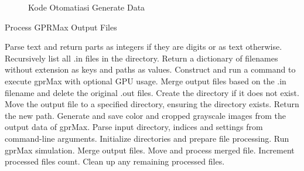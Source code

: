 \begin{minipage}{\linewidth}
\begin{figure} [H]
    \caption{Kode Otomatiasi Generate Data}
    \label{fig:autoflow}
  \end{figure}
\end{minipage}

\begin{algorithm}
  \caption{Process GPRMax Output Files}
  \begin{algorithmic}[1]
      \State Parse text and return parts as integers if they are digits or as text otherwise.
  \EndFunction
  \State
      \State Recursively list all .in files in the directory.
      \State Return a dictionary of filenames without extension as keys and paths as values.
  \EndFunction
  \State
      \State Construct and run a command to execute gprMax with optional GPU usage.
  \EndFunction
  \State
      \State Merge output files based on the .in filename and delete the original .out files.
  \EndFunction
  \State
      \State Create the directory if it does not exist.
  \EndFunction
  \State
      \State Move the output file to a specified directory, ensuring the directory exists.
      \State Return the new path.
  \EndFunction
  \State
      \State Generate and save color and cropped grayscale images from the output data of gprMax.
  \EndFunction
  \State
      \State Parse input directory, indices and settings from command-line arguments.
      \State Initialize directories and prepare file processing.
          \State Run gprMax simulation.
              \State Merge output files.
              \State Move and process merged file.
          \EndIf
          \State Increment processed files count.
      \EndFor
      \State Clean up any remaining processed files.
  \EndProcedure
  \end{algorithmic}
  \end{algorithm}

